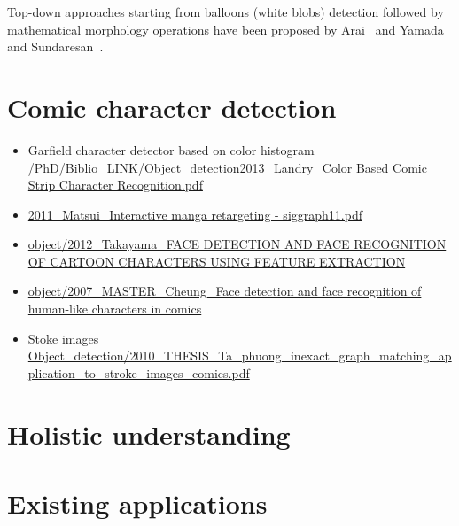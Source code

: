 Top-down approaches starting from balloons (white blobs) detection followed by mathematical morphology operations have been proposed by Arai~\cite{Arai11} and Yamada~\cite{Yam04} and Sundaresan~\cite{Sundaresan2012Text}.



\section{Comic character detection}
\label{sec:sota:comic_character}

\begin{itemize}
	\item Garfield character detector based on color histogram \url{/PhD/Biblio_LINK/Object_detection2013_Landry_Color Based Comic Strip Character Recognition.pdf}
	\item \url{2011_Matsui_Interactive manga retargeting - siggraph11.pdf}
	\item \url{object/2012_Takayama_FACE DETECTION AND FACE RECOGNITION
OF CARTOON CHARACTERS USING FEATURE EXTRACTION}
	\item \url{object/2007_MASTER_Cheung_Face detection and face recognition of human-like characters in comics}
	\item Stoke images \url{Object_detection/2010_THESIS_Ta_phuong_inexact_graph_matching_application_to_stroke_images_comics.pdf}
\end{itemize}

\section{Holistic understanding} %
\label{sec:sota:holistic_understanding}


\section{Existing applications}
\label{sec:sota:applications}

